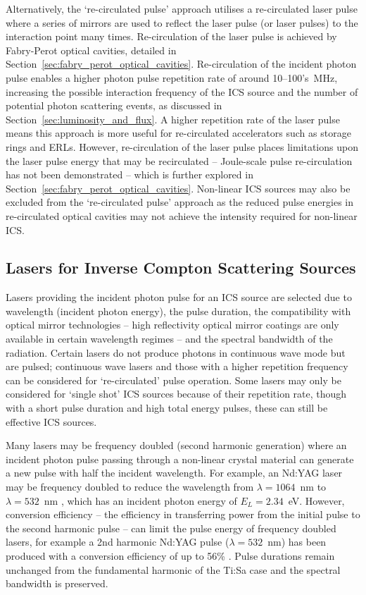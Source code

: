 \documentclass[../main.tex]{subfiles}
\begin{document}
Alternatively, the `re-circulated pulse' approach utilises a re-circulated laser pulse where a series of mirrors are used to reflect the laser pulse (or laser pulses) to the interaction point many times. Re-circulation of the laser pulse is achieved by Fabry-Perot optical cavities, detailed in Section~\ref{sec:fabry_perot_optical_cavities}. Re-circulation of the incident photon pulse enables a higher photon pulse repetition rate of around 10--100's~\si{\mega\hertz}, increasing the possible interaction frequency of the ICS source and the number of potential photon scattering events, as discussed in Section~\ref{sec:luminosity_and_flux}. A higher repetition rate of the laser pulse means this approach is more useful for re-circulated accelerators such as storage rings and ERLs. However, re-circulation of the laser pulse places limitations upon the laser pulse energy that may be recirculated -- Joule-scale pulse re-circulation has not been demonstrated -- which is further explored in Section~\ref{sec:fabry_perot_optical_cavities}. Non-linear ICS sources may also be excluded from the `re-circulated pulse' approach as the reduced pulse energies in re-circulated optical cavities may not achieve the intensity required for non-linear ICS.     

\subsection{Lasers for Inverse Compton Scattering Sources}
\label{sec:ICS_lasers}

Lasers providing the incident photon pulse for an ICS source are selected due to wavelength (incident photon energy), the pulse duration, the compatibility with optical mirror technologies -- high reflectivity optical mirror coatings are only available in certain wavelength regimes -- and the spectral bandwidth of the radiation. Certain lasers do not produce photons in continuous wave mode but are pulsed; continuous wave lasers and those with a higher repetition frequency can be considered for `re-circulated' pulse operation. Some lasers may only be considered for `single shot' ICS sources because of their repetition rate, though with a short pulse duration and high total energy pulses, these can still be effective ICS sources.

Many lasers may be frequency doubled (second harmonic generation) \cite{franken1961generation} where an incident photon pulse passing through a non-linear crystal material can generate a new pulse with half the incident wavelength. For example, an Nd:YAG laser may be frequency doubled to reduce the wavelength from $\lambda=1064$~\si{\nano\meter} to $\lambda=532$~\si{\nano\meter} \cite{kozlovsky1988efficient}, which has an incident photon energy of $E_{L}=2.34$~\si{\electronvolt}. However, conversion efficiency -- the efficiency in transferring power from the initial pulse to the second harmonic pulse -- can limit the pulse energy of frequency doubled lasers, for example a 2nd harmonic Nd:YAG pulse ($\lambda = 532$~\si{\nano\meter}) has been produced with a conversion efficiency of up to 56\% \cite{kozlovsky1988efficient}. Pulse durations remain unchanged from the fundamental harmonic of the Ti:Sa case and the spectral bandwidth is preserved.  
\end{document}
